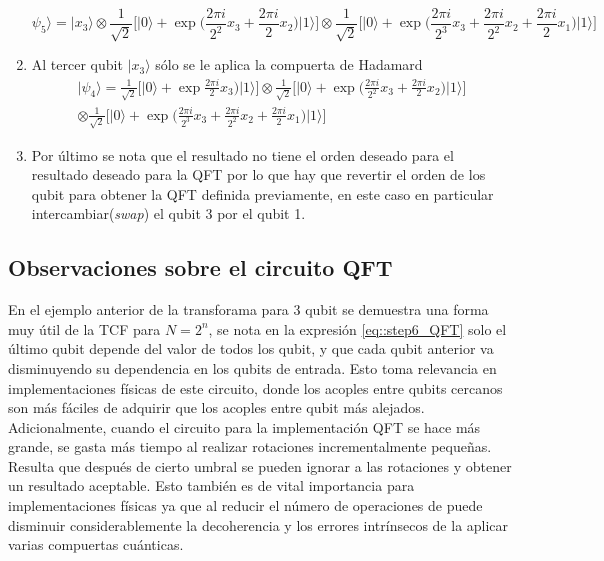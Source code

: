 \documentclass[a4paper]{article}
\begin{document}
\begin{enumerate}
\begin{equation}
\psi_5\rangle=\vert x_3\rangle \otimes \frac{1}{\sqrt{2}}\bigg[ \vert 0\rangle + \exp{\bigg(\frac{2\pi i}{2^2} x_3 + \frac{2\pi i}{2} x_2 \bigg)}\vert 1\rangle\bigg] \otimes  \frac{1}{\sqrt{2}}\bigg[ \vert 0\rangle + \exp{\bigg(\frac{2\pi i}{2^3} x_3 +\frac{2\pi i}{2^2} x_2+\frac{2\pi i}{2} x_1\bigg)}\vert 1\rangle\bigg]
\end{equation}
\item Al tercer qubit $\vert x_3\rangle$ sólo se le aplica la compuerta de Hadamard
\begin{equation}\label{eq::step6_QFT}
\begin{aligned}
\vert \psi_4 \rangle= \frac{1}{\sqrt{2}}\bigg[ \vert 0\rangle + \exp{ \frac{2\pi i}{2} x_3 \bigg)}\vert 1\rangle\bigg] \otimes \frac{1}{\sqrt{2}}\bigg[ \vert 0\rangle + \exp{\bigg(\frac{2\pi i}{2^2} x_3 + \frac{2\pi i}{2} x_2 \bigg)}\vert 1\rangle\bigg]\\
 \otimes  \frac{1}{\sqrt{2}}\bigg[ \vert 0\rangle + \exp{\bigg(\frac{2\pi i}{2^3} x_3 +\frac{2\pi i}{2^2} x_2+\frac{2\pi i}{2} x_1\bigg)}\vert 1\rangle\bigg]
\end{aligned}
\end{equation}
\item Por último se nota que el resultado no tiene el orden deseado para el resultado deseado para la QFT por lo que hay que revertir el orden de los qubit para obtener la QFT definida previamente, en este caso en particular intercambiar(\textit{swap}) el qubit 3 por el qubit 1.
\end{enumerate}
\subsection{Observaciones sobre el circuito QFT}
En el ejemplo anterior de la transforama para 3 qubit se demuestra una forma muy útil de la TCF para $N=2^n$, se nota en la expresión \ref{eq::step6_QFT} solo el último qubit depende del valor de todos los qubit, y que cada qubit anterior va disminuyendo su dependencia en los qubits de entrada. Esto toma relevancia en implementaciones físicas de este circuito, donde los acoples entre qubits cercanos son más fáciles de adquirir que los acoples entre qubit más alejados.\\

Adicionalmente, cuando el circuito para la implementación QFT se hace más grande, se gasta más tiempo al realizar rotaciones incrementalmente pequeñas. Resulta que después de cierto umbral se pueden ignorar a las rotaciones y obtener un resultado aceptable. Esto también es de vital importancia para implementaciones físicas ya que al reducir el número de operaciones de puede disminuir considerablemente la decoherencia y los errores intrínsecos de la aplicar varias compuertas cuánticas.
\end{document}
